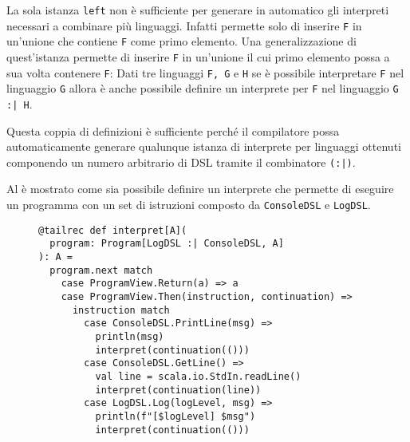 La sola istanza \lstinline{left} non è sufficiente per generare in automatico gli interpreti necessari a combinare più linguaggi. Infatti permette solo di inserire \lstinline{F} in un'unione che contiene \lstinline{F} come primo elemento. Una generalizzazione di quest'istanza permette di inserire \lstinline{F} in un'unione il cui primo elemento possa a sua volta contenere \lstinline{F}:
Dati tre linguaggi \lstinline{F, G} e \lstinline{H} se è possibile interpretare \lstinline{F} nel linguaggio \lstinline{G} allora è anche possibile definire un interprete per \lstinline{F} nel linguaggio \lstinline{G :| H}.

Questa coppia di definizioni è sufficiente perché il compilatore possa automaticamente generare qualunque istanza di interprete per linguaggi ottenuti componendo un numero arbitrario di DSL tramite il combinatore \lstinline{(:|)}.

Al  è mostrato come sia possibile definire un interprete che permette di eseguire un programma con un set di istruzioni composto da \lstinline{ConsoleDSL} e \lstinline{LogDSL}.

\begin{figure}[htp]
  \begin{lstlisting}[language=scala3, caption={Esempio di interpretazione di un programma composto da più DSL. Il \emph{pattern matching} sulle istruzioni permette di gestire istruzioni provenienti da entrambi i DSL di base.}, label={lst:echo}]
@tailrec def interpret[A](
  program: Program[LogDSL :| ConsoleDSL, A]
): A =
  program.next match
    case ProgramView.Return(a) => a
    case ProgramView.Then(instruction, continuation) =>
      instruction match
        case ConsoleDSL.PrintLine(msg) =>
          println(msg)
          interpret(continuation(()))
        case ConsoleDSL.GetLine() =>
          val line = scala.io.StdIn.readLine()
          interpret(continuation(line))
        case LogDSL.Log(logLevel, msg) =>
          println(f"[$logLevel] $msg")
          interpret(continuation(()))
  \end{lstlisting}
\end{figure}




